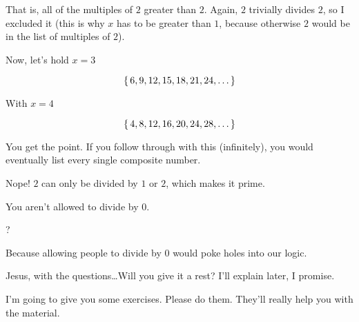 \begin{example}
    That is, all of the multiples of $2$ greater than $2$. Again, $2$ trivially
    divides $2$, so I excluded it (this is why $x$ has to be greater than $1$,
    because otherwise $2$ would be in the list of multiples of $2$).

    Now, let's hold $x = 3$

    \begin{equation}
        \left\{\, 6, 9, 12, 15, 18, 21, 24, \dots \,\right\}
    \end{equation}

    With $x = 4$

    \begin{equation}
        \left\{\, 4, 8, 12, 16, 20, 24, 28, \dots \,\right\}
    \end{equation}

    You get the point. If you follow through with this (infinitely), you would
    eventually list every single composite number.


    Nope! $2$ can only be divided by $1$ or $2$, which makes it prime.


    You aren't allowed to divide by $0$.

    ?

    Because allowing people to divide by $0$ would poke holes into our logic.


    Jesus, with the questions\dots Will you give it a rest? I'll explain later,
    I promise.
\end{example}

I'm going to give you some exercises. Please do them. They'll really help you
with the material.

